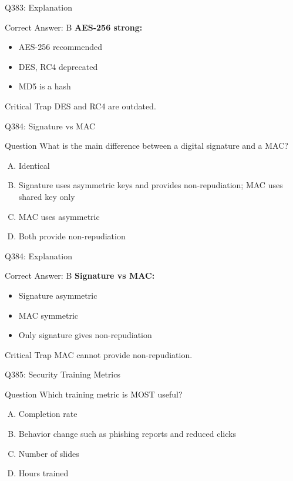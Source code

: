 \documentclass{beamer}
\begin{document}
	\begin{frame}{Q383: Explanation}
		\begin{block}{Correct Answer: B}
			\textbf{AES-256 strong:}
			\begin{itemize}
				\item AES-256 recommended
				\item DES, RC4 deprecated
				\item MD5 is a hash
			\end{itemize}
		\end{block}
		\begin{alertblock}{Critical Trap}
			DES and RC4 are outdated.
		\end{alertblock}
	\end{frame}
	
	\begin{frame}{Q384: Signature vs MAC}
		\begin{block}{Question}
			What is the main difference between a digital signature and a MAC?
		\end{block}
		\begin{enumerate}[(A)]
			\item Identical
			\item Signature uses asymmetric keys and provides non-repudiation; MAC uses shared key only
			\item MAC uses asymmetric
			\item Both provide non-repudiation
		\end{enumerate}
	\end{frame}
	
	\begin{frame}{Q384: Explanation}
		\begin{block}{Correct Answer: B}
			\textbf{Signature vs MAC:}
			\begin{itemize}
				\item Signature asymmetric
				\item MAC symmetric
				\item Only signature gives non-repudiation
			\end{itemize}
		\end{block}
		\begin{alertblock}{Critical Trap}
			MAC cannot provide non-repudiation.
		\end{alertblock}
	\end{frame}
	
	\begin{frame}{Q385: Security Training Metrics}
		\begin{block}{Question}
			Which training metric is MOST useful?
		\end{block}
		\begin{enumerate}[(A)]
			\item Completion rate
			\item Behavior change such as phishing reports and reduced clicks
			\item Number of slides
			\item Hours trained
		\end{enumerate}
	\end{frame}
	
\end{document}
